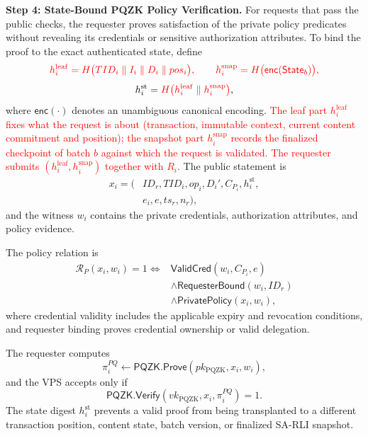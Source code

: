 \documentclass[lettersize,journal]{IEEEtran}
\begin{document}
\medskip
\noindent\textbf{Step 4: State-Bound PQZK Policy Verification.}
For requests that pass the public checks, the requester proves
satisfaction of the private policy predicates without revealing its
credentials or sensitive authorization attributes. To bind the proof
to the exact authenticated state, define
\begin{equation}
\textcolor{red}{h_i^{\mathrm{leaf}}
=
H\big(
TID_i\parallel I_i\parallel D_i\parallel pos_i
\big),
\qquad
h_i^{\mathrm{snap}}
=
H\big(\mathsf{enc}(\mathsf{State}_b)\big),}
\label{eq:hleaf_hsnap}
\end{equation}
\begin{equation}
h_i^{\mathrm{st}}
=
\textcolor{red}{H\big(h_i^{\mathrm{leaf}}\parallel h_i^{\mathrm{snap}}\big)},
\end{equation}
where $\mathsf{enc}(\cdot)$ denotes an unambiguous canonical encoding.
\textcolor{red}{The leaf part $h_i^{\mathrm{leaf}}$ fixes what the request
is about (transaction, immutable context, current content commitment and
position); the snapshot part $h_i^{\mathrm{snap}}$ records the finalized
checkpoint of batch $b$ against which the request is validated. The
requester submits $(h_i^{\mathrm{leaf}},h_i^{\mathrm{snap}})$ together
with $R_i$.}
The public statement is
\begin{equation}
\begin{aligned}
x_i=\big(&ID_r,TID_i,op_i,D_i',
C_{P_i},h_i^{\mathrm{st}},\\
& e_i,e,ts_r,n_r\big),
\end{aligned}
\end{equation}
and the witness $w_i$ contains the private credentials,
authorization attributes, and policy evidence.

The policy relation is
\begin{equation}
\begin{aligned}
\mathcal{R}_{P}(x_i,w_i)=1
\iff{}&
\mathsf{ValidCred}(w_i,C_{P_i},e)\\
&\land
\mathsf{RequesterBound}(w_i,ID_r)\\
&\land
\mathsf{PrivatePolicy}(x_i,w_i),
\end{aligned}
\end{equation}
where credential validity includes the applicable expiry and revocation
conditions, and requester binding proves credential ownership or valid
delegation.

The requester computes
\begin{equation}
\pi_i^{PQ}\leftarrow
\mathsf{PQZK.Prove}
(pk_{\mathrm{PQZK}},x_i,w_i),
\end{equation}
and the VPS accepts only if
\begin{equation}
\mathsf{PQZK.Verify}
(vk_{\mathrm{PQZK}},x_i,\pi_i^{PQ})=1.
\end{equation}
The state digest $h_i^{\mathrm{st}}$ prevents a valid proof from being
transplanted to a different transaction position, content state, batch
version, or finalized SA-RLI snapshot.
\end{document}
